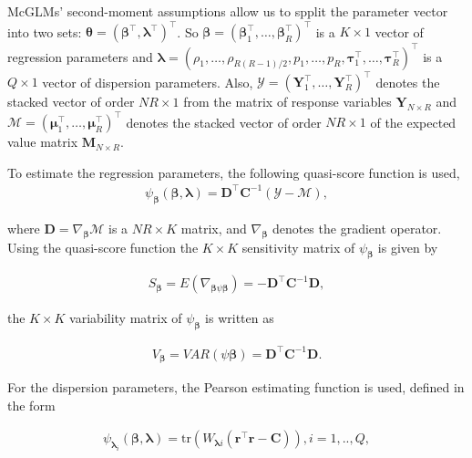 \documentclass[AMA,STIX1COL]{WileyNJD-v2}
\begin{document}
McGLMs' second-moment assumptions allow us to spplit the parameter vector into two sets: $\boldsymbol{\theta} = (\boldsymbol{\beta}^{\top}, \boldsymbol{\lambda}^{\top})^ {\top}$. So $\boldsymbol{\beta} = (\boldsymbol{\beta}_1^\top, \ldots, \boldsymbol{\beta}_R^\top)^\top$ is a $K \times 1$ vector of regression parameters and $\boldsymbol{\lambda} = (\rho_1, \ldots, \rho_{R(R-1)/2}, p_1, \ldots, p_R, \boldsymbol{\tau}_1^\top , \ldots, \boldsymbol{\tau}_R^\top)^\top$ is a $Q \times 1$ vector of dispersion parameters. Also, $\mathcal{Y} = (\boldsymbol{Y}_1^\top, \ldots, \boldsymbol{Y}_R^\top)^\top$ denotes the stacked vector of order $NR \times 1$ from the matrix of response variables $\boldsymbol{Y}_{N \times R}$ and $\mathcal{M} = (\boldsymbol{\mu}_1^\top, \ldots, \boldsymbol{\mu}_R^ \top)^\top$ denotes the stacked vector of order $NR \times 1$ of the expected value matrix $\boldsymbol{M}_{N \times R}$.

To estimate the regression parameters, the following quasi-score function \cite{Liang86} is used, 
$$
\begin{aligned}
  \psi_{\boldsymbol{\beta}}(\boldsymbol{\beta},
  \boldsymbol{\lambda}) = \boldsymbol{D}^\top
  \boldsymbol{C}^{-1}(\mathcal{Y} - \mathcal{M}),
\end{aligned}
$$

\noindent where $\boldsymbol{D} = \nabla_{\boldsymbol{\beta}} \mathcal{M}$ is a $NR \times K$ matrix, and $\nabla_{\boldsymbol{\beta}}$ denotes the gradient operator. Using the quasi-score function the $K \times K$ sensitivity matrix of $\psi_{\boldsymbol{\beta}}$ is given by

$$
\begin{aligned}
S_{\boldsymbol{\beta}} = E(\nabla_{\boldsymbol{\beta} \psi \boldsymbol{\beta}}) = -\boldsymbol{D}^{\top} \boldsymbol{C}^{-1} \boldsymbol{D},
\end{aligned}
$$

\noindent the $K \times K$ variability matrix of $\psi_{\boldsymbol{\beta}}$ is written as

$$
\begin{aligned}
V_{\boldsymbol{\beta}} = VAR(\psi \boldsymbol{\beta}) = \boldsymbol{D}^{\top} \boldsymbol{C}^{-1} \boldsymbol{D}.
\end{aligned}
$$

For the dispersion parameters, the Pearson estimating function is used, defined in the form

$$
  \begin{aligned}
    \psi_{\boldsymbol{\lambda}_i}(\boldsymbol{\beta},
    \boldsymbol{\lambda}) =
    \mathrm{tr}(W_{\boldsymbol{\lambda}i}
    (\boldsymbol{r}^\top\boldsymbol{r} -
    \boldsymbol{C})),  i = 1,.., Q, 
  \end{aligned}
$$
\end{document}
